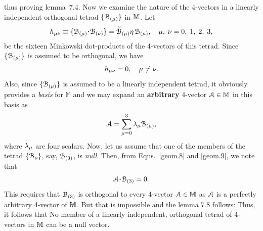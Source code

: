 thus proving lemma~7.4.
{} Now we examine the nature of the 4-vectors 
in a linearly independent orthogonal tetrad 
$\{\EuScript{B}_{({\mu})}\}$  in $\mathbb{M}$. Let
\begin{align}\label{geom.7} 
h_{\gkm\nu}\equiv\{\EuScript{B}_{(\gkm)}\dotp 
\EuScript{B}_{(\nu)}\}=\tilde{\EuScript{B}}_{(\gkm)}
\gky\,\EuScript{B}_{(\gkm)}, \quad 
\gkm ,\; \gkn=0,\;1,\;2,\;3,
\end{align} 
be the sixteen Minkowski dot-products of the 4-vectors 
of this tetrad. Since  $\{\EuScript{B}_{({\mu})}\}$  is 
assumed to be orthogonal, we have
\begin{align}\label{geom.8} 
h_{{\mu}\nu}=0,\quad {\mu} \neq {\nu}.
\end{align} 
Also, since $\{\EuScript{B}_{({\mu})}\}$ is assumed to 
be a linearly independent  tetrad, it obviously 
provides a \textsl{basis} for $\mathbb{M}$ and we may 
expand an \textbf{arbitrary} 4-vector 
$\EuScript{A}\in\mathbb{M}$ in this basis as
\begin{align}\label{geom.9}
\EuScript{A} = 
\sum_{{\mu}=0}^{3}{\lambda}_{{\mu}}\EuScript{B}_{({\mu})},
\end{align}
where ${\lambda}_{{\mu}}$ are four scalars. 
Now, let us assume that one of the members of the 
tetrad $\{\EuScript{B}_{{\rho}} \}$,  say, 
$\EuScript{B}_{(3)}$, is \textsl{null}. Then, from
Eqns.~\break\eqref{geom.8} and \eqref{geom.9}, we note that
\begin{align*}
 \EuScript{A}\dotp \EuScript{B}_{(3)}=0.
\end{align*}
This requires that  $\EuScript{B}_{(3)} $ is orthogonal 
to every 4-vector
$\EuScript{A}\in \mathbb{M}$ as  $\EuScript{A}$ is a 
perfectly arbitrary 4-vector of $\mathbb{M}$. But that is 
impossible and the lemma 7.8 follows: Thus, it follows 
that 
\Lem No member of a linearly independent, orthogonal 
tetrad of 4-vectors in $\mathbb{M}$ can be a null vector.

